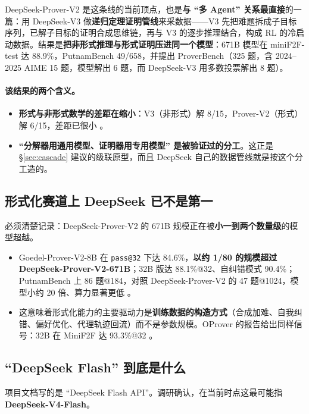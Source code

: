 \documentclass[UTF8,a4paper,11pt,fontset=windows]{ctexart}
\newcommand{\code}[1]{\texttt{#1}}
\begin{document}
DeepSeek-Prover-V2 \cite{dsprov2} 是这条线的当前顶点，也是\textbf{与 ``多 Agent'' 关系最直接}的一篇：用 DeepSeek-V3 做\textbf{递归定理证明管线}来采数据——V3 先把难题拆成子目标序列，已解子目标的证明合成思维链，再与 V3 的逐步推理结合，构成 RL 的冷启动数据。结果是\textbf{把非形式推理与形式证明压进同一个模型}：671B 模型在 miniF2F-test 达 88.9\%，PutnamBench 49/658，并提出 ProverBench（325 题，含 2024--2025 AIME 15 题，模型解出 6 题，而 DeepSeek-V3 用多数投票解出 8 题）\cite{dsprov2}。

\paragraph{该结果的两个含义。}
\begin{itemize}
  \item \textbf{形式与非形式数学的差距在缩小}：V3（非形式）解 8/15，Prover-V2（形式）解 6/15，差距已很小 \cite{dsprov2}。
  \item \textbf{``分解器用通用模型、证明器用专用模型'' 是被验证过的分工}。这正是 \S\ref{sec:cascade} 建议的级联原型，而且 DeepSeek 自己的数据管线就是按这个分工造的。
\end{itemize}

\subsection{形式化赛道上 DeepSeek 已不是第一}

必须清楚记录：DeepSeek-Prover-V2 的 671B 规模正在被\textbf{小一到两个数量级}的模型超越。

\begin{itemize}
  \item Goedel-Prover-V2-8B 在 \code{pass@32} 下达 84.6\%，\textbf{以约 1/80 的规模超过 DeepSeek-Prover-V2-671B}；32B 版达 88.1\%@32、自纠错模式 90.4\%；PutnamBench 上 86 题@184，对照 DeepSeek-Prover-V2 的 47 题@1024，模型小约 20 倍、算力显著更低 \cite{goedelv2}。
  \item 这意味着形式化能力的主要驱动力是\textbf{训练数据的构造方式}（合成加难、自我纠错、偏好优化、代理轨迹回流）而不是参数规模。OProver 的报告给出同样信号：32B 在 MiniF2F 达 93.3\%@32 \cite{oprover}。
\end{itemize}

\subsection{``DeepSeek Flash'' 到底是什么}

项目文档写的是 ``DeepSeek Flash API''。调研确认，在当前时点这最可能指 \textbf{DeepSeek-V4-Flash}。
\end{document}
